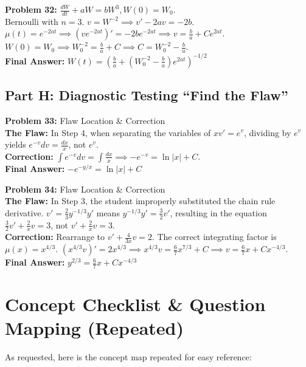 \documentclass[12pt]{article}
\begin{document}
\vspace{10pt}
\textbf{Problem 32:} $\frac{dW}{dt} + aW = bW^3, W(0)=W_0$. \\
Bernoulli with $n=3$. $v = W^{-2} \implies v' - 2av = -2b$. \\
$\mu(t) = e^{-2at} \implies (ve^{-2at})' = -2b e^{-2at} \implies v = \frac{b}{a} + C e^{2at}$. \\
$W(0)=W_0 \implies W_0^{-2} = \frac{b}{a} + C \implies C = W_0^{-2} - \frac{b}{a}$. \\
\textbf{Final Answer:} $W(t) = \left( \frac{b}{a} + \left(W_0^{-2} - \frac{b}{a}\right)e^{2at} \right)^{-1/2}$

\subsection*{Part H: Diagnostic Testing ``Find the Flaw''}

\textbf{Problem 33:} Flaw Location \& Correction \\
\textbf{The Flaw:} In Step 4, when separating the variables of $xv' = e^v$, dividing by $e^v$ yields $e^{-v} dv = \frac{dx}{x}$, not $e^v$. \\
\textbf{Correction:} $\int e^{-v} dv = \int \frac{dx}{x} \implies -e^{-v} = \ln|x| + C$. \\
\textbf{Final Answer:} $-e^{-y/x} = \ln|x| + C$

\vspace{10pt}
\textbf{Problem 34:} Flaw Location \& Correction \\
\textbf{The Flaw:} In Step 3, the student improperly substituted the chain rule derivative. $v' = \frac{2}{3}y^{-1/3}y'$ means $y^{-1/3}y' = \frac{3}{2}v'$, resulting in the equation $\frac{3}{2}v' + \frac{2}{x}v = 3$, not $v' + \frac{2}{x}v = 3$. \\
\textbf{Correction:} Rearrange to $v' + \frac{4}{3x}v = 2$. The correct integrating factor is $\mu(x) = x^{4/3}$. $(x^{4/3}v)' = 2x^{4/3} \implies x^{4/3}v = \frac{6}{7}x^{7/3} + C \implies v = \frac{6}{7}x + C x^{-4/3}$. \\
\textbf{Final Answer:} $y^{2/3} = \frac{6}{7}x + C x^{-4/3}$

\newpage
\section{Concept Checklist \& Question Mapping (Repeated)}
As requested, here is the concept map repeated for easy reference:
\end{document}
